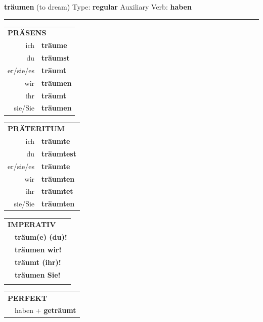 \documentclass[10pt,a4paper]{revtex4-2}
\begin{document}
\begin{verbbox}
    {\Large \bf träumen} (to dream) \hfill Type: \textbf{regular} \hfill Auxiliary Verb: \textbf{haben} 
    
     \vspace{5pt}

    \hrule
    
    \vspace{5pt}

  \begin{tabular}{rl}
     \multicolumn{2}{l}{\textbf{PRÄSENS} }\\
    ich & \textbf{träume}\\
    du & \textbf{träumst}\\
    er/sie/es & \textbf{träumt}\\
    wir & \textbf{träumen}\\
    ihr & \textbf{träumt}\\
    sie/Sie & \textbf{träumen}\\
  \end{tabular}
  \hfill
     \begin{tabular}{rl}
    \multicolumn{2}{l}{\textbf{PRÄTERITUM} }\\
    ich & \textbf{träumte}\\
    du & \textbf{träumtest}\\
    er/sie/es & \textbf{träumte}\\
    wir & \textbf{träumten}\\
    ihr & \textbf{träumtet}\\
    sie/Sie & \textbf{träumten}\\
  \end{tabular}
  \hfill
  \begin{tabular}{rl}
     \multicolumn{2}{l}{\textbf{IMPERATIV} }\\
   & \textbf{träum(e) (du)!}\\
   & \textbf{träumen wir!}\\
   & \textbf{träumt (ihr)!}\\
   & \textbf{träumen Sie!}\\
   & \vspace{10pt}
  \end{tabular}

    \vspace{10pt}

 \begin{tabular}{rl}
     \multicolumn{2}{l}{\textbf{PERFEKT}}\\
   & haben + \textbf{geträumt}\\
  \end{tabular}
\hfill
   \begin{tabular}{rl}
   

\end{tabular}
\end{verbbox}
\end{document}
